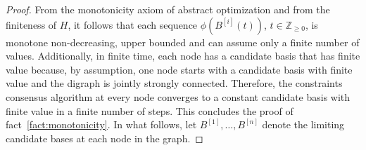 \documentclass[onecolumn,journal,letterpaper]{IEEEtran}
\newcommand{\integernonnegative}{{\mathbb{Z}_{\geq0}}}
\newcommand{\naturalzero}{\mathbb{N}_0}
\renewcommand{\naturalzero}{\integernonnegative}
\newcommand{\supind}[2]{{#1}^{[#2]}}
\begin{document}
 \begin{proof}
   From the monotonicity axiom of abstract optimization and from the
   finiteness of $H$, it follows that each sequence
   $\phi(\supind{B}{i}(t))$, $t\in \naturalzero$, is monotone
   non-decreasing, upper bounded and can assume only a finite number of
   values.  Additionally, in finite time, each node has a candidate basis
   that has finite value because, by assumption, one node starts with a
   candidate basis with finite value and the digraph is jointly strongly
   connected.  Therefore, the constraints consensus algorithm at every node
   converges to a constant candidate basis with finite value in a finite
   number of steps. This concludes the proof of
   fact~\ref{fact:monotonicity}.  In what follows, let
   $\supind{B}{1},\dots,\supind{B}{n}$ denote the limiting candidate bases
   at each node in the graph.


\end{proof}
\end{document}
